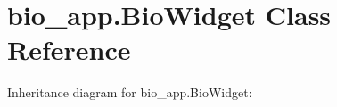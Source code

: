 \hypertarget{classbio__app_1_1BioWidget}{}\section{bio\+\_\+app.\+Bio\+Widget Class Reference}
\label{classbio__app_1_1BioWidget}


Inheritance diagram for bio\+\_\+app.\+Bio\+Widget\+:
